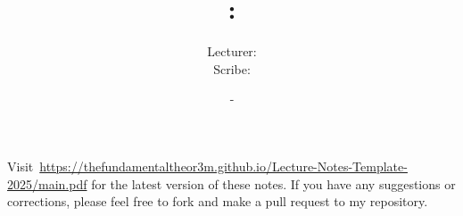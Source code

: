 \documentclass[a4paper, 12pt, openany, oneside]{book}
\title{\vspace{-2em}\COURSENUMBER: \COURSENAME}
\author{Lecturer: \LECTURER \\ Scribe: \SCRIBE}
\date{\UNIVERSITY - \TERM}
\begin{document}
\setlength{\abovedisplayskip}{7.5pt}  %
\setlength{\belowdisplayskip}{7.5pt}  %
\setlength{\abovedisplayshortskip}{2pt}
\setlength{\belowdisplayshortskip}{2pt}

\maketitle
\thispagestyle{empty}

\tableofcontents
\thispagestyle{empty}

\newpage

\nocite{*}




% 

\newpage




\printbibliography[prenote=mybibnote]
\thispagestyle{empty}

Visit~\url{https://thefundamentaltheor3m.github.io/Lecture-Notes-Template-2025/main.pdf} for the latest version of these notes. If you have any suggestions or corrections, please feel free to fork and make a pull request to my repository.
\end{document}
